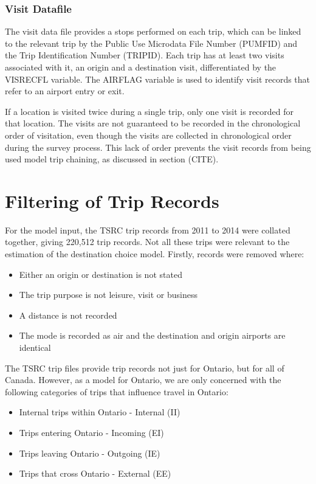 \subsubsection{Visit Datafile}
The visit data file provides a stops performed on each trip, which can be linked to the relevant trip by the Public Use Microdata File Number (PUMFID) and the Trip Identification Number (TRIPID). Each trip has at least two visits associated with it, an origin and a destination visit, differentiated by the VISRECFL variable. The AIRFLAG variable is used to identify visit records that refer to an airport entry or exit. 

If a location is visited twice during a single trip, only one visit is recorded for that location. The visits are not guaranteed to be recorded in the chronological order of visitation, even though the visits are collected in chronological order during the survey process. This lack of order prevents the visit records from being used model trip chaining, as discussed in section (CITE).

\section{Filtering of Trip Records}
For the model input, the TSRC trip records from 2011 to 2014 were collated together, giving 220,512 trip records. Not all these trips were relevant to the estimation of the destination choice model. Firstly, records were removed where:
\begin{itemize}
\item Either an origin or destination is not stated
\item The trip purpose is not leisure, visit or business
\item A distance is not recorded
\item The mode is recorded as air and the destination and origin airports are identical
\end{itemize}

The TSRC trip files provide trip records not just for Ontario, but for all of Canada. However, as a model for Ontario, we are only concerned with the following categories of trips that influence travel in Ontario:
\begin{itemize}
\item Internal trips within Ontario - Internal (II)
\item Trips entering Ontario - Incoming (EI)
\item Trips leaving Ontario - Outgoing (IE)
\item Trips that cross Ontario - External (EE)
\end{itemize}

